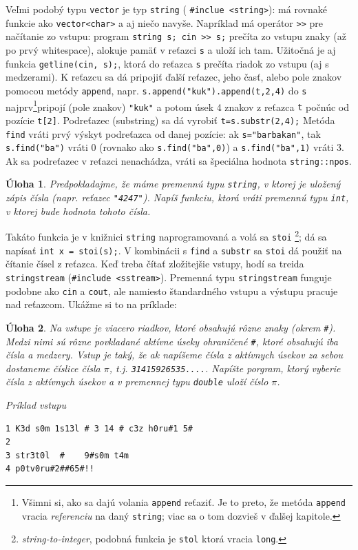 \documentclass[10pt]{article}
\def\prg{\lstinline}
\def\ods{\vspace*{10pt}}
\newtheorem{uloha}{Úloha}
\begin{document}
\ods Veľmi podobý typu {\tt vector} je typ {\tt string} (
\prg!#inclue <string>!): má rovnaké funkcie
ako \prg!vector<char>! a aj niečo navyše. Napríklad má operátor {\tt >>}
pre načítanie zo vstupu: program \prg!string s; cin >> s;! prečíta zo vstupu
znaky (až po prvý whitespace), alokuje pamäť v reťazci {\tt s} a uloží ich tam.
Užitočná je aj funkcia \prg!getline(cin, s);!, ktorá do reťazca {\tt s}
prečíta riadok zo vstupu (aj s medzerami). K reťazcu sa dá pripojiť ďalší reťazec,
jeho časť, alebo pole znakov pomocou metódy {\tt append}, napr.
\prg!s.append("kuk").append(t,2,4)! do {\tt s} najprv\footnote{%
  Všimni si, ako sa dajú volania \prg!append! reťaziť. Je to preto, že metóda 
  \prg!append! vracia {\em referenciu} na daný \prg!string!; viac sa o tom
  dozvieš v ďalšej kapitole.
}pripojí (pole znakov) 
\prg!"kuk"! a potom úsek 4 znakov z reťazca {\tt t} počnúc od pozície \prg!t[2]!.
Podreťazec (substring) sa dá vyrobiť \prg!t=s.substr(2,4);! Metóda {\tt find} 
vráti prvý výskyt podreťazca od danej pozície: ak \prg!s="barbakan"!, tak
\prg!s.find("ba")! vráti 0 (rovnako ako \prg!s.find("ba",0)!)
a \prg!s.find("ba",1)! vráti 3. Ak sa podreťazec v reťazci nenachádza, vráti 
sa špeciálna hodnota {\tt string::npos}. 

\ods
\begin{uloha}
  Predpokladajme, že máme premennú typu \prg!string!, v ktorej je uložený
  zápis čísla (napr. reťazec \prg!"4247"!). Napíš funkciu, ktorá vráti premennú
  typu \prg!int!, v ktorej bude hodnota tohoto čísla.
\end{uloha}

\ods 
Takáto funkcia je v knižnici \prg!string! naprogramovaná a volá sa \prg!stoi!
\footnote{{\em string-to-integer}, podobná funkcia je \prg!stol!
ktorá vracia \prg!long!.}; dá sa napísať \prg!int x = stoi(s);!. 
V kombinácii s \prg!find! a \prg!substr! sa \prg!stoi! dá použiť na čítanie
čísel z reťazca. Keď treba čítať zložitejšie vstupy, 
hodí sa  treida \prg!stringstream! (\prg!#include <sstream>!).
Premenná typu {\tt stringstream} funguje podobne ako \prg!cin! a \prg!cout!, ale
namiesto štandardného vstupu a výstupu pracuje nad reťazcom. Ukážme si to na príklade:

\begin{uloha}
  Na vstupe je viacero riadkov, ktoré obsahujú rôzne znaky (okrem {\tt\#}).  
  Medzi nimi sú rôzne povkladané aktívne úseky ohraničené {\tt\#}, ktoré obsahujú 
  iba čísla a medzery. Vstup je taký, že ak napíšeme čísla z aktívnych
  úsekov za sebou dostaneme číslice čísla $\pi$, t.j. {\tt 31415926535....}.
  Napíšte porgram, ktorý vyberie čísla z aktívnych úsekov a v premennej typu \prg!double!
  uloží číslo $\pi$.

\ods Príklad vstupu
\begin{verbatim}
1 K3d s0m 1s13l # 3 14 # c3z h0ru#1 5#
2
3 str3t0l  #    9#s0m t4m
4 p0tv0ru#2##65#!!
  \end{verbatim}
\end{uloha}
\end{document}
